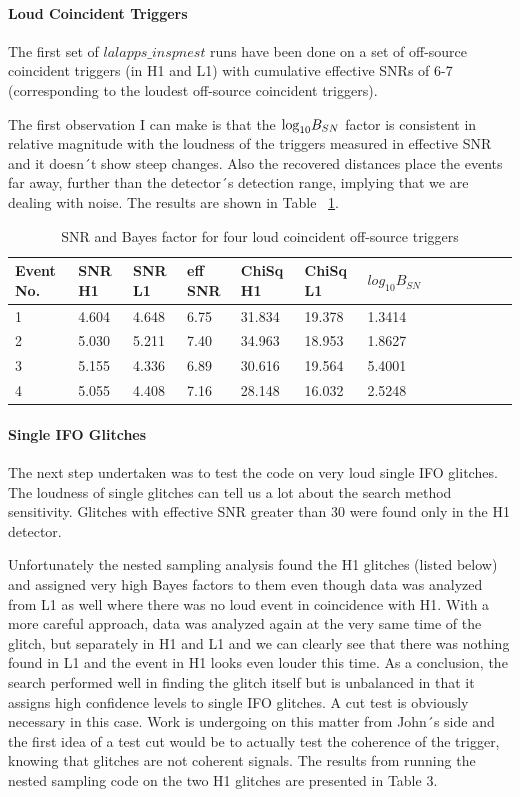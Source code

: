 \documentclass[epsf]{article}
\begin{document}
\paragraph{Loud Coincident Triggers}
 The first set of $lalapps\_inspnest$ runs have been done on a set of off-source coincident triggers (in H1 and L1) with cumulative effective SNRs of 6-7 (corresponding to the loudest off-source coincident triggers). 

The first observation I can make is that the ${\rm log}_{10}B_{SN}$ factor is consistent in relative magnitude with the loudness of the triggers measured in effective SNR and it doesn´t show steep changes. Also the recovered distances place the events far away, further than the detector´s detection range, implying that we are dealing with noise. The results are shown in Table ~\ref{tab:Table2}.

\begin{table}
 \begin{tabular}{|l|l|l|l|l|l|l|l|l|l|l|l|l|}
 \hline
 \hline
 Event No. & SNR H1 & SNR L1 & eff SNR & ChiSq H1 & ChiSq L1 & $log_{10}B_{SN}$ \\
 \hline
 \hline
 1 & 4.604 & 4.648 & 6.75 & 31.834 & 19.378 & 1.3414 \\
 2 & 5.030 & 5.211 & 7.40 & 34.963 & 18.953 & 1.8627 \\
 3 & 5.155 & 4.336 & 6.89 & 30.616 & 19.564 & 5.4001 \\
 4 & 5.055 & 4.408 & 7.16 & 28.148 & 16.032 & 2.5248 \\
 \hline
 \hline
 \end{tabular} 
 \caption{SNR and Bayes factor for four loud coincident off-source triggers}
 \label{tab:Table2}
\end{table}

\paragraph{Single IFO Glitches}
 The next step undertaken was to test the code on very loud single IFO glitches. The loudness of single glitches can tell us a lot about the search method sensitivity. Glitches with effective SNR greater than 30 were found only in the H1 detector. 
 
 Unfortunately the nested sampling analysis found the H1 glitches (listed below) and assigned very high Bayes factors to them even though data was analyzed from L1 as well where there was no loud event in coincidence with H1. With a more careful approach, data was analyzed again at the very same time of the glitch, but separately in H1 and L1 and we can clearly see that there was nothing found in L1 and the event in H1 looks even louder this time. As a conclusion, the search performed well in finding the glitch itself but is unbalanced in that it assigns high confidence levels to single IFO glitches. A cut test is obviously necessary in this case. Work is undergoing on this matter from John´s side and the first idea of a test cut would be to actually test the coherence of the trigger, knowing that glitches are not coherent signals. The results from running the nested sampling code on the two H1 glitches are presented in Table 3.
\end{document}
